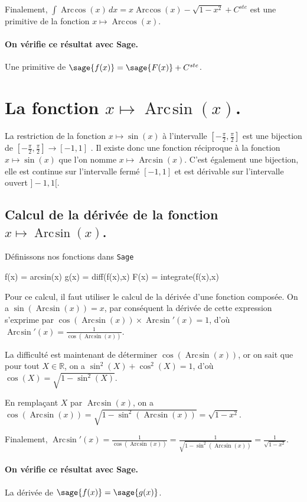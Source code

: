 \documentclass[a4paper,landscape,17pt]{extreport} %
\def\eclaire{\mathbb}
\def\R{\ensuremath{\eclaire R}}
\renewcommand{\arcsin}{\mathop{\mathrm{Arc\mspace{2mu}sin}}}
\renewcommand{\arccos}{\mathop{\mathrm{Arc\mspace{2mu}cos}}}
\begin{document}
Finalement, $\int \arccos(x) \, dx = x  \arccos(x) - \sqrt{1- x^2} + C^{ste} $ est une primitive de la fonction $x \mapsto \arccos(x) $.
\paragraph{On vérifie ce résultat avec Sage.}
Une primitive de $\sage{f(x)} = \sage{F(x)} + C^{ste}$.


\section{La fonction  $x \mapsto \arcsin(x) $.}
La restriction de la fonction $x \mapsto \sin(x) $ à l'intervalle $\left[-\frac{\pi}{2},\frac{\pi}{2}\right]$ est une bijection de $\left[-\frac{\pi}{2},\frac{\pi}{2}\right] \rightarrow [-1,1]$ . Il existe donc une fonction réciproque à la fonction $x \mapsto \sin(x) $ que l'on nomme $x \mapsto \arcsin(x) $. C'est également une bijection, elle est continue sur l'intervalle fermé  $ [-1,1]$ et est dérivable sur l'intervalle ouvert $]-1,1[$.

\subsection{Calcul de la dérivée de la fonction $x \mapsto \arcsin(x) $.}
Définissons nos fonctions dans {\texttt{Sage}}
\begin{sageblock}
    f(x) = arcsin(x)
    g(x) = diff(f(x),x)
    F(x) = integrate(f(x),x)
\end{sageblock}

Pour ce calcul, il faut utiliser le calcul de la dérivée d'une fonction composée. On a $\sin(\arcsin(x))=x$, par conséquent la dérivée de cette expression s'exprime par $ \cos(\arcsin(x)) \times \arcsin\nolimits'(x) = 1$, d'où $\arcsin\nolimits'(x) = \frac{1}{\cos(\arcsin(x))} $.

La difficulté est maintenant de déterminer $\cos(\arcsin(x))$, or on sait que pour tout $X \in \R$, on a $\sin^2(X) + \cos^2(X) = 1$, d'où $\cos(X) = \sqrt{1-\sin^2(X)}$.

En remplaçant $X$ par $\arcsin(x)$, 
on a $\cos(\arcsin(x)) = \sqrt{1-\sin^2(\arcsin(x))} = \sqrt{1- x^2}$.

Finalement, $\arcsin\nolimits'(x)  = \frac{1}{\cos(\arcsin(x))}  = \frac{1}{\sqrt{1-\sin^2(\arcsin(x))}} =  \frac{1}{\sqrt{1- x^2}} $.
\paragraph{On vérifie ce résultat avec Sage.}
La dérivée de $\sage{f(x)} = \sage{g(x)} $.
\end{document}

